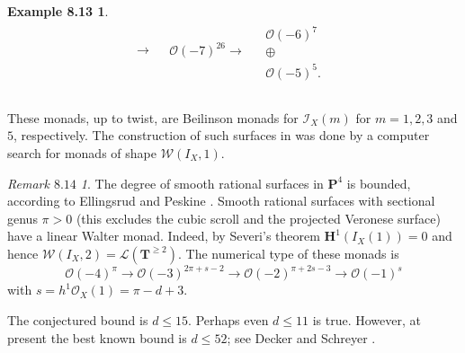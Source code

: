 \documentclass{tran-l}
\newcommand{\myH}{\mathbf{H}}
\newcommand{\I}{\mathcal{I}}
\newcommand{\PP}{\mathbf{P}}
\newcommand{\TT}{\mathbf{T}}
\newcommand{\W}{\mathcal{W}}
\theoremstyle{plain}
\theoremstyle{remark}
\newtheorem*{remark1}{Remark $8.14$}
\theoremstyle{definition}
\newtheorem*{definition13}{Example 8.13}
\begin{document}
\begin{definition13}
\begin{equation*}
\begin{matrix}
\begin{matrix}
\to \\\\\\\end{matrix}
&
\begin{matrix}\mathcal{O} (-7)^{26}\to \\\\\\\end{matrix}
& \begin{matrix}\mathcal{O} (-6)^{7}\\\oplus \\\mathcal{O} (-5)^{5}.\\\quad & \\\end{matrix}
\end{matrix}
\end{equation*}

These monads, up to twist,  are  Beilinson monads for $\I _{X}(m)$ for
$m=1,2,3$ and $5$,
respectively.
The construction of such surfaces in \cite{Sch}
was done by a computer search for monads of
 shape $\W (I_{X},1)$.
\end{definition13}
\begin{remark1}
The degree of smooth rational surfaces in $\PP ^{4}$ is bounded, according to
Ellingsrud and Peskine \cite{EPe}. Smooth rational surfaces with sectional genus
 $\pi >0$ (this excludes the cubic scroll and the projected Veronese  surface)
have a linear Walter monad. Indeed, by Severi's theorem $\myH ^{1}(I_{X}(1))=0$ and hence $\W (I_{X},2)=\mathcal{L}(\TT ^{\ge 2})$. The numerical type of these monads is
\begin{equation*}\mathcal{O} (-4)^{\pi }\to \mathcal{O} (-3)^{2\pi +s-2}\to \mathcal{O} (-2)^{\pi +2s-3} \to \mathcal{O} (-1)^{s}\end{equation*}
with $s=h^{1}\mathcal{O} _{X}(1)=\pi -d+3$.

The conjectured bound is $d \le 15$. Perhaps even $d\le 11$ is true.
However, at present the best known bound is $d \le 52$; see Decker and 
Schreyer \cite{DS2}.
\end{remark1}
\end{document}

